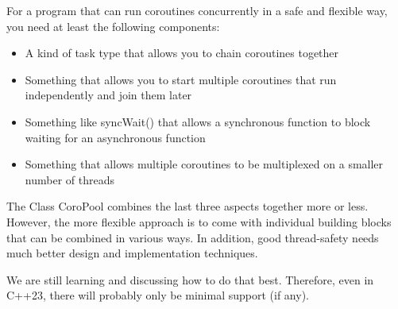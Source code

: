 For a program that can run coroutines concurrently in a safe and flexible way, you need at least the following components:

\begin{itemize}
\item 
A kind of task type that allows you to chain coroutines together

\item 
Something that allows you to start multiple coroutines that run independently and join them later

\item 
Something like syncWait() that allows a synchronous function to block waiting for an asynchronous function

\item 
Something that allows multiple coroutines to be multiplexed on a smaller number of threads
\end{itemize}

The Class CoroPool combines the last three aspects together more or less. However, the more flexible approach is to come with individual building blocks that can be combined in various ways. In addition, good thread-safety needs much better design and implementation techniques.

We are still learning and discussing how to do that best. Therefore, even in C++23, there will probably only be minimal support (if any).



